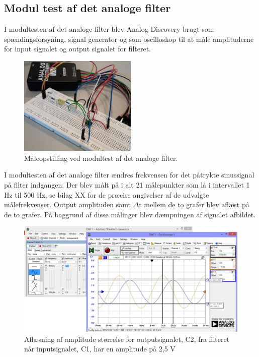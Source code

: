 \subsection{Modul test af det analoge filter}
I modultesten af det analoge filter blev Analog Discovery brugt som spændingsforsyning, signal generator og som oscilloskop til at måle amplituderne for input signalet og output signalet for filteret.

\begin{figure}[H]
	\centering
	\includegraphics[width=0.5\textwidth]{Figurer/Hardware/FilterTest}
	\caption{Måleopstilling ved modultest af det analoge filter.}
	\label{fig:FilterTest}
\end{figure}

I modultesten af det analoge filter ændres frekvensen for det påtrykte sinussignal på filter indgangen. Der blev målt på i alt 21 målepunkter som lå i intervallet 1 Hz til 500 Hz, se bilag XX for de præcise angivelser af de udvalgte målefrekvenser. Output amplituden samt $\Delta$t mellem de to grafer blev aflæst på de to grafer. På baggrund af disse målinger blev dæmpningen af signalet afbildet. 

\begin{figure}[H]
	\centering
	\includegraphics[width=1\textwidth]{Figurer/Hardware/AnalogScreenFilterAmp}
	\caption{Aflæsning af amplitude størrelse for outputsignalet, C2, fra filteret når inputsignalet, C1, har en amplitude på 2,5 V}
	\label{fig:FilterAmplitude}
\end{figure}

